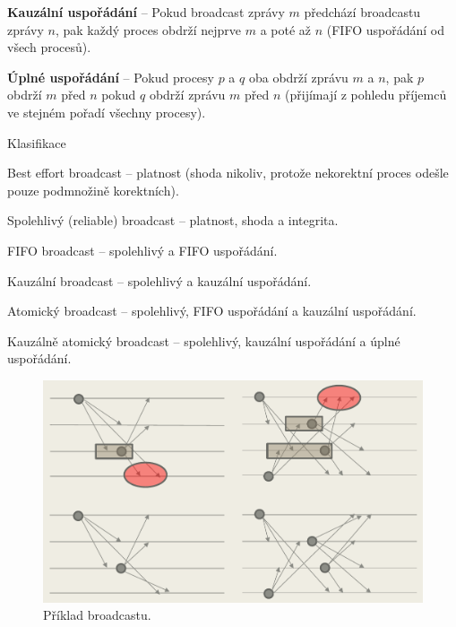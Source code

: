 \begin{compactitem}
\begin{compactitem}
        \item \textbf{Kauzální uspořádání} -- Pokud broadcast zprávy $m$ předchází broadcastu zprávy $n$, pak každý proces obdrží nejprve $m$ a poté až $n$ (FIFO uspořádání od všech procesů).

        \item \textbf{Úplné uspořádání} -- Pokud procesy $p$ a $q$ oba obdrží zprávu $m$ a $n$, pak $p$ obdrží $m$ před $n$ pokud $q$ obdrží zprávu $m$ před $n$ (přijímají z pohledu příjemců ve stejném pořadí všechny procesy).
    \end{compactitem}

    \item Klasifikace \begin{compactitem}
        \item Best effort broadcast -- platnost (shoda nikoliv, protože nekorektní proces odešle pouze podmnožině korektních).
        \item Spolehlivý (reliable) broadcast -- platnost, shoda a integrita.
        \item FIFO broadcast -- spolehlivý a FIFO uspořádání.
        \item Kauzální broadcast -- spolehlivý a kauzální uspořádání.
        \item Atomický broadcast -- spolehlivý, FIFO uspořádání a kauzální uspořádání.
        \item Kauzálně atomický broadcast -- spolehlivý, kauzální uspořádání a úplné uspořádání.
    \end{compactitem}

    \begin{figure}[H]
        \centering
        \includegraphics[width=1\linewidth]{broadcast.pdf}
        \caption{Příklad broadcastu.}
    \end{figure}
\end{compactitem}
